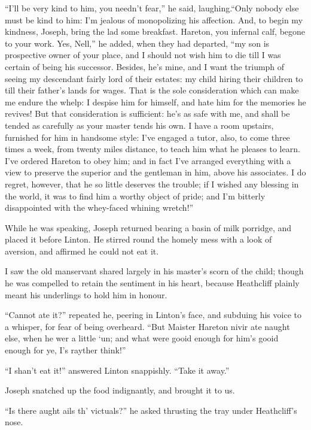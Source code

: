 \par “I'll be very kind to him, you needn't fear,” he said, laughing.“Only nobody else must be kind to him: I'm jealous of monopolizing his affection. And, to begin my kindness, Joseph, bring the lad some breakfast. Hareton, you infernal calf, begone to your work. Yes, Nell,” he added, when they had departed, “my son is prospective owner of your place, and I should not wish him to die till I was certain of being his successor. Besides, he's mine, and I want the triumph of seeing my descendant fairly lord of their estates: my child hiring their children to till their father's lands for wages. That is the sole consideration which can make me endure the whelp: I despise him for himself, and hate him for the memories he revives! But that consideration is sufficient: he's as safe with me, and shall be tended as carefully as your master tends his own. I have a room upstairs, furnished for him in handsome style: I've engaged a tutor, also, to come three times a week, from twenty miles distance, to teach him what he pleases to learn. I've ordered Hareton to obey him; and in fact I've arranged everything with a view to preserve the superior and the gentleman in him, above his associates. I do regret, however, that he so little deserves the trouble; if I wished any blessing in the world, it was to find him a worthy object of pride; and I'm bitterly disappointed with the whey-faced whining wretch!”
\par While he was speaking, Joseph returned bearing a basin of milk porridge, and placed it before Linton. He stirred round the homely mess with a look of aversion, and affirmed he could not eat it.
\par I saw the old manservant shared largely in his master's scorn of the child; though he was compelled to retain the sentiment in his heart, because Heathcliff plainly meant his underlings to hold him in honour.
\par “Cannot ate it?” repeated he, peering in Linton's face, and subduing his voice to a whisper, for fear of being overheard. “But Maister Hareton nivir ate naught else, when he wer a little ‘un; and what were gooid enough for him's gooid enough for ye, I's rayther think!”
\par “I shan't eat it!” answered Linton snappishly. “Take it away.”
\par Joseph snatched up the food indignantly, and brought it to us.
\par “Is there aught ails th' victuals?” he asked thrusting the tray under Heathcliff's nose.
